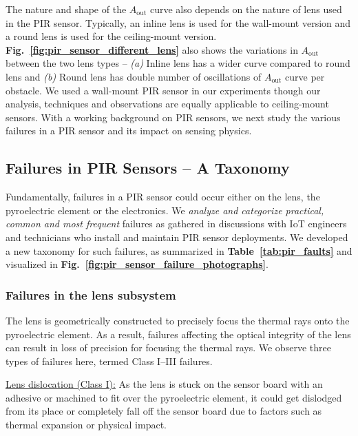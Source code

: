 \documentclass[manuscript]{acmart}
\newcommand{\ca}{{\it (a) }}
\newcommand{\cb}{{\it (b) }}
\newcommand{\aout}{$A_{\text{out}}$\xspace}
\begin{document}
The nature and shape of the \aout curve also depends on the nature of lens used in the PIR sensor. Typically, an inline lens is used for the wall-mount version and a round lens is used for the ceiling-mount version. {\bfseries Fig.~\ref{fig:pir_sensor_different_lens}} also shows the variations in \aout between the two lens types -- \ca Inline lens has a wider curve compared to round lens and \cb Round lens has double number of oscillations of \aout curve per obstacle. We used a wall-mount PIR sensor in our experiments though our analysis, techniques and observations are equally applicable to ceiling-mount sensors. With a working background on PIR sensors, we next study the various failures in a PIR sensor and its impact on sensing physics. \subsection{Failures in PIR Sensors -- A Taxonomy} 
\label{subsec:taxonomy} 

Fundamentally, failures in a PIR sensor could occur either on the lens, the pyroelectric element or the electronics. We \textit{analyze and categorize practical, common and most frequent} failures as gathered in discussions with IoT engineers and technicians who install and maintain PIR sensor deployments. 
We developed a new taxonomy for such failures, as summarized in {\bfseries Table~\ref{tab:pir_faults}} and visualized in {\bfseries Fig.~\ref{fig:pir_sensor_failure_photographs}}.\subsubsection{\textbf{Failures in the lens subsystem}} The lens is geometrically constructed to precisely focus the thermal rays onto the pyroelectric element. As a result, failures affecting the optical integrity of the lens can result in loss of precision for focusing the thermal rays. We observe three types of failures here, termed Class I--III failures.


\noindent \underline{Lens dislocation (Class I):} As the lens is stuck on the sensor board with an adhesive or machined to fit over the pyroelectric element, it could get dislodged from its place or completely fall off the sensor board due to factors such as thermal expansion or physical impact.
\end{document}

